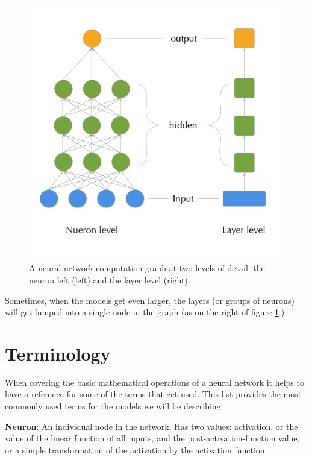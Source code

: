 \documentclass[]{book}
\theoremstyle{definition}
\theoremstyle{definition}
\theoremstyle{definition}
\theoremstyle{remark}
\begin{document}
\begin{figure}

{\centering \includegraphics{figures/computation_graph} 

}

\caption{A neural network computation graph at two levels of detail: the neuron left (left) and the layer level (right).}\label{fig:compgraph}
\end{figure}

Sometimes, when the models get even larger, the layers (or groups of
neurons) will get lumped into a single node in the graph (as on the
right of figure \ref{fig:compgraph}.)

\section{Terminology}\label{terminology}

When covering the basic mathematical operations of a neural network it
helps to have a reference for some of the terms that get used. This list
provides the most commonly used terms for the models we will be
describing.

\textbf{Neuron}: An individual node in the network. Has two values:
activation, or the value of the linear function of all inputs, and the
post-activation-function value, or a simple transformation of the
activation by the activation function.
\end{document}
